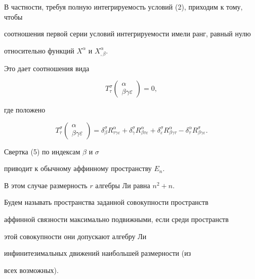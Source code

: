 В частности, требуя полную интегрируемость условий (2), приходим к тому, чтобы


соотношения первой серии условий интегрируемости имели ранг, равный нулю


относительно функций $X^{\alpha}$ и $X^{\alpha}_{,\beta}$. 


Это дает соотношения вида


$$


T^{\sigma}_{\tau}


\begin{pmatrix}


\alpha\\ \beta \gamma \varepsilon\end{pmatrix}=0,


$$


где положено


\begin{equation}


T^{\sigma}_{\tau}


\begin{pmatrix}\alpha\\ \beta \gamma \varepsilon\end{pmatrix}


=\delta^{\sigma}_{\beta}R^{\alpha}_{\tau \gamma \varepsilon}


+\delta^{\sigma}_{\gamma}R^{\alpha}_{\beta \tau \varepsilon}


+\delta^{\sigma}_{\varepsilon}R^{\alpha}_{\beta \gamma \tau}


-\delta^{\alpha}_{\tau}R^{\sigma}_{\beta \gamma \varepsilon}.


\end{equation}


Свертка (5) по индексам $\beta $ и $\sigma $


приводит к обычному аффинному пространству $E_n$.


В этом случае размерность $r$ алгебры Ли равна $n^2+n$.





Будем называть пространства заданной совокупности пространств


аффинной связности максимально подвижными, если среди пространств


этой совокупности они допускают алгебру Ли


инфинитезимальных движений наибольшей размерности (из


всех возможных).





